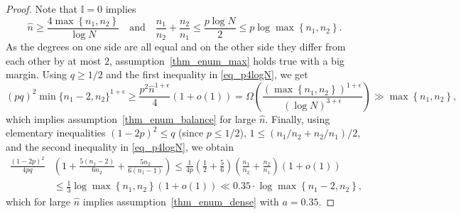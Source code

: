 \documentclass[12pt,reqno]{amsart}
\newcommand{\I} {\mathbb I}
\theoremstyle{definition}
\begin{document}
\begin{proof}
Note that $\I = 0$ implies
\begin{equation}
  \label{eq_p4logN}
  \hat n \ge \frac{4\max \left\{ n_1,n_2 \right\}} {\log N} \quad \text{and} \quad \frac{n_1}{n_2} + \frac{n_2}{n_1} \le \frac{p \log N}{2} \le p \log \max \left\{ n_1, n_2 \right\}.
\end{equation}
As the degrees on one side are all equal and on the other side they differ from each other by at most $2$, assumption~\ref{thm_enum_max} holds true with a big margin.
Using $q \ge 1/2$ and the first inequality in \eqref{eq_p4logN}, we get
\[
  (pq)^2\min\{n_1 - 2,n_2\}^{1 + \epsilon} \ge \frac{p^2\hat n^{1 + \epsilon}}{4}(1 + o(1))  = \Omega \left( \frac{ \left(\max \left\{ n_1, n_2 \right\}\right)^{1 + \epsilon}}{(\log N)^{3 + \epsilon}}  \right) \gg \max \left\{ n_1, n_2 \right\},
\]
which implies assumption~\ref{thm_enum_balance} for large $\hat n$.
Finally, using elementary inequalities $(1 - 2p)^2 \le q$ (since $p \le 1/2$), $1 \le \left( n_1/n_2 + n_2/n_1 \right)/2$, and the second inequality in \eqref{eq_p4logN}, we obtain
\begin{align*}
  \frac{(1 - 2p)^2}{4pq} &\left(1 + \frac{5(n_1 - 2)}{6n_2} + \frac{5n_2}{6(n_1 - 1)}\right) \le \frac{1}{4p}\left( \frac{1}{2} + \frac{5}{6} \right)\left(\frac{n_1}{n_2} + \frac{n_2}{n_1}\right) (1 + o(1)) \\
  &\le \frac{1}{3}\log \max \left\{ n_1, n_2 \right\} (1 + o(1))  \ll 0.35 \cdot \log \max \left\{ n_1 - 2, n_2 \right\},
\end{align*}
which for large $\hat n$ implies assumption~\ref{thm_enum_dense} with $a = 0.35$.


\end{proof}
\end{document}
